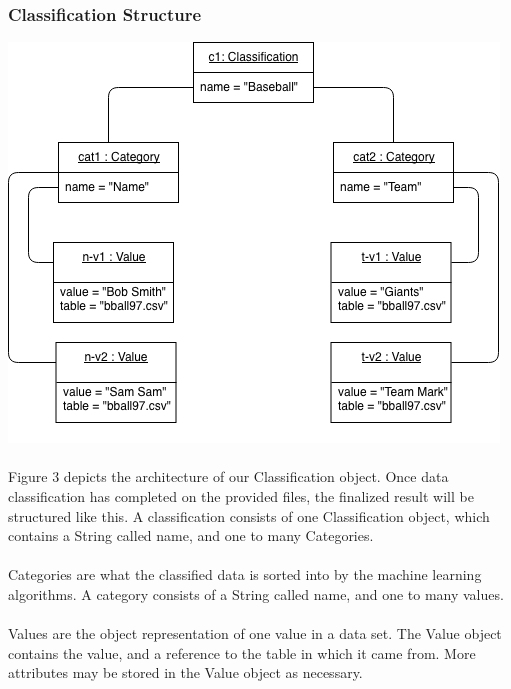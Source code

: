 \documentclass[12pt,oneside,letterpaper]{article}
\begin{document}
\subsubsection{Classification Structure}
\includegraphics[scale = 0.9]{spencer_object.png}
\begingroup
{}
\endgroup

\paragraph{} Figure 3 depicts the architecture of our Classification object. Once data classification has completed on the provided files, the finalized result will be structured like this. A classification consists of one Classification object, which contains a String called name, and one to many Categories. 
\paragraph{} Categories are what the classified data is sorted into by the machine learning algorithms. A category consists of a String called name, and one to many values.
\paragraph{} Values are the object representation of one value in a data set. The Value object contains the value, and a reference to the table in which it came from. More attributes may be stored in the Value object as necessary.
\end{document}
